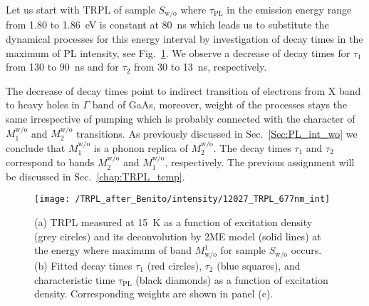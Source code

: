 Let us start with TRPL of sample $S_\mathrm{w/o}$ where $\tau_\mathrm{PL}$ in the emission energy range from 1.80 to 1.86~eV is constant at 80~ns which leads us to substitute the dynamical processes for this energy interval by investigation of decay times in the maximum of PL intensity, see Fig.~\ref{fig:TRPL_int_wo}. We observe a decrease of decay times for $\tau_1$ from 130 to 90~ns and for $\tau_2$ from 30 to 13~ns, respectively.

The decrease of decay times point to indirect transition of electrons from X band to heavy holes in $\Gamma$ band of GaAs, moreover, weight of the processes stays the same irrespective of pumping which is probably connected with the character of $M_1^\mathrm{w/o}$ and $M_2^\mathrm{w/o}$ transitions. As previously discussed in Sec.~\ref{Sec:PL_int_wo} we conclude that $M_1^\mathrm{w/o}$ is a phonon replica of $M_2^\mathrm{w/o}$. The decay times $\tau_1$ and $\tau_2$ correspond to bands $M_2^\mathrm{w/o}$ and $M_1^\mathrm{w/o}$, respectively. The previous assignment will be discussed in Sec.~\ref{chap:TRPL_temp}.


%

\begin{figure}
	\centering
	\texttt{[image: /TRPL\_after\_Benito/intensity/12027\_TRPL\_677nm\_int]}
	\caption{(a) TRPL measured at 15~K as a function of excitation density (grey circles) and its deconvolution by 2ME model (solid lines) at the energy where maximum of band $M^1_\mathrm{w/o}$ for sample $S_\mathrm{w/o}$ occurs. (b) Fitted decay times $\tau_1$ (red circles), $\tau_2$ (blue squares), and characteristic time $\tau_\mathrm{PL}$ (black diamonds) as a function of excitation density. Corresponding weights are shown in panel (c).}
	\label{fig:TRPL_int_wo}
\end{figure}

